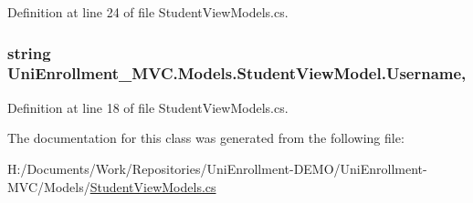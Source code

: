 Definition at line 24 of file Student\+View\+Models.\+cs.

\subsubsection[{\texorpdfstring{Username}{Username}}]{\setlength{\rightskip}{0pt plus 5cm}string Uni\+Enrollment\+\_\+\+M\+V\+C.\+Models.\+Student\+View\+Model.\+Username\hspace{0.3cm}{\ttfamily [get]}, {\ttfamily [set]}}\hypertarget{class_uni_enrollment___m_v_c_1_1_models_1_1_student_view_model_a96ba162e18af0894ae751c273c797585}{}\label{class_uni_enrollment___m_v_c_1_1_models_1_1_student_view_model_a96ba162e18af0894ae751c273c797585}


Definition at line 18 of file Student\+View\+Models.\+cs.



The documentation for this class was generated from the following file\+:\begin{DoxyCompactItemize}
\item 
H\+:/\+Documents/\+Work/\+Repositories/\+Uni\+Enrollment-\/\+D\+E\+M\+O/\+Uni\+Enrollment-\/\+M\+V\+C/\+Models/\hyperlink{_student_view_models_8cs}{Student\+View\+Models.\+cs}\end{DoxyCompactItemize}
